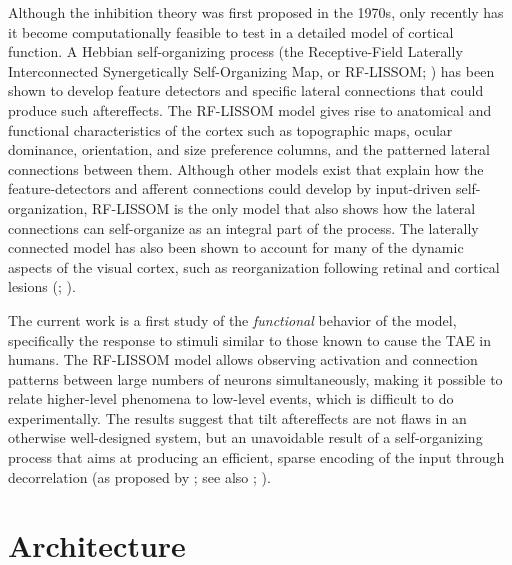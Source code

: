 \documentclass[10pt]{article}   %
\begin{document}
Although the inhibition theory was first proposed in the 1970s, only recently
has it become computationally feasible to test in a detailed
model of cortical function.  A Hebbian self-organizing process (the
Receptive-Field Laterally Interconnected Synergetically
Self-Organizing Map, or RF-LISSOM; )
has been shown to develop feature detectors and specific lateral
connections that could produce such aftereffects.  The
RF-LISSOM model gives rise to anatomical and functional
characteristics of the cortex such as topographic maps, ocular
dominance, orientation, and size preference columns, and the patterned
lateral connections between them.  Although other models exist that
explain how the feature-detectors and afferent connections could
develop by input-driven self-organization, RF-LISSOM is the only model
that also shows how the lateral connections can self-organize as an
integral part of the process.  The laterally connected model has also
been shown to account for many of the dynamic aspects of the visual
cortex, such as reorganization following retinal and cortical lesions
(;
). 

The current work is a first study of the {\em functional\/} behavior
of the model, specifically the response to stimuli similar to those
known to cause the TAE in humans.  The RF-LISSOM model allows
observing activation and connection patterns between large
numbers of neurons simultaneously, making it possible to relate
higher-level phenomena to low-level events, which is difficult to do
experimentally.  The results suggest that tilt aftereffects are not
flaws in an otherwise well-designed system, but an unavoidable result
of a self-organizing process that aims at producing an efficient,
sparse encoding of the input through decorrelation (as proposed by
; see also
; 
).



\section{Architecture}
\end{document}
